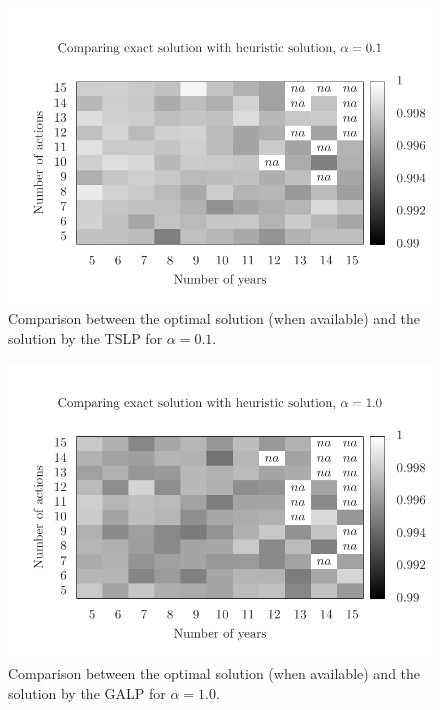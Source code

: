\begin{figure}
\centering
\includegraphics[scale=0.5, trim=0.75cm 0cm 0 2cm, clip=true]{imgs/comp_hard_ts.pdf}
\caption{Comparison between the optimal solution (when available) 
and the solution by the TSLP for $\alpha=0.1$.}
\label{fig:mh2_2}
\end{figure}
 
\begin{figure}
\centering
\includegraphics[scale=0.5, trim=0.75cm 0cm 0 2cm, clip=true]{imgs/comp_easy.pdf}
\caption{Comparison between the optimal solution (when available) 
and the solution by the GALP for $\alpha=1.0$.}
\label{fig:mh1_3}
\end{figure}

